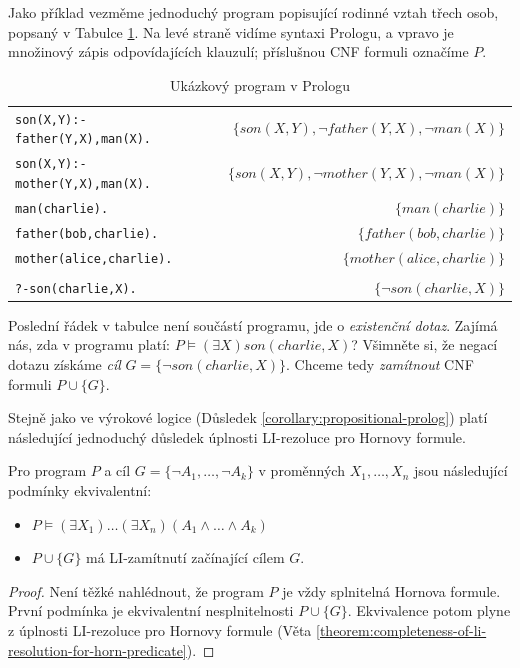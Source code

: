 \begin{example}\label{example:predicate-prolog-program}
Jako příklad vezměme jednoduchý program popisující rodinné vztah třech osob, popsaný v Tabulce \ref{table:predicate-prolog-program}. Na levé straně vidíme syntaxi Prologu, a vpravo je množinový zápis odpovídajících klauzulí; příslušnou CNF formuli označíme $P$.

\begin{table}[h]\centering   
    \begin{tabular}{lr}
        \texttt{son(X,Y):-father(Y,X),man(X).} 
        & 
        $\{son(X,Y),\neg father(Y,X),\neg man(X)\}$
        \\
        \texttt{son(X,Y):-mother(Y,X),man(X).}
        &
        $\{son(X,Y),\neg mother(Y,X),\neg man(X)\}$
        \\
        \texttt{man(charlie). }
        &
        $\{man(charlie)\}$
        \\
        \texttt{father(bob,charlie). }
        &
        $\{father(bob,charlie)\}$
        \\
        \texttt{mother(alice,charlie).} 
        &
        $\{mother(alice,charlie)\}$
        \\
        \\
        \texttt{?-son(charlie,X). }
        &
        $\{\neg son(charlie,X)\}$
    \end{tabular}
    \label{table:predicate-prolog-program}
    \caption{Ukázkový program v Prologu}    
\end{table} 

Poslední řádek v tabulce není součástí programu, jde o \emph{existenční dotaz}. Zajímá nás, zda v programu platí:
$P\models(\exists X)son(charlie,X)$? Všimněte si, že negací dotazu získáme \emph{cíl} $G=\{\neg son(charlie,X)\}$. Chceme tedy \emph{zamítnout} CNF formuli $P\cup\{G\}$. 
\end{example}

Stejně jako ve výrokové logice (Důsledek \ref{corollary:propositional-prolog}) platí následující jednoduchý důsledek úplnosti LI-rezoluce pro Hornovy formule.

\begin{corollary}
Pro program $P$ a cíl $G=\{\neg A_1,\dots,\neg A_k\}$ v proměnných $X_1,\dots,X_n$ jsou následující podmínky ekvivalentní:
\begin{itemize}
    \item $P\models(\exists X_1)\dots(\exists X_n)(A_1\wedge\dots\wedge A_k)$
    \item $P\cup\{G\}$ má LI-zamítnutí začínající cílem $G$.
\end{itemize}
\end{corollary}
\begin{proof}
Není těžké nahlédnout, že program $P$ je vždy splnitelná Hornova formule. První podmínka je ekvivalentní nesplnitelnosti $P\cup\{G\}$. Ekvivalence potom plyne z úplnosti LI-rezoluce pro Hornovy formule (Věta \ref{theorem:completeness-of-li-resolution-for-horn-predicate}).
\end{proof}

